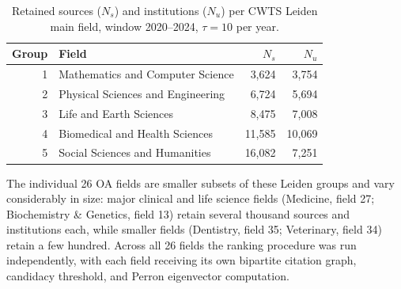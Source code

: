 \begin{table}[ht]
\centering
\caption{Retained sources ($N_s$) and institutions ($N_u$) per CWTS Leiden main field,
         window 2020--2024, $\tau = 10$ per year.}
\label{tab:scale}
\begin{tabular}{rlrr}
\toprule
Group & Field & $N_s$ & $N_u$ \\
\midrule
1 & Mathematics and Computer Science  &  3,624 &  3,754 \\
2 & Physical Sciences and Engineering &  6,724 &  5,694 \\
3 & Life and Earth Sciences           &  8,475 &  7,008 \\
4 & Biomedical and Health Sciences    & 11,585 & 10,069 \\
5 & Social Sciences and Humanities    & 16,082 &  7,251 \\
\bottomrule
\end{tabular}
\end{table}

The individual 26 OA fields are smaller subsets of these Leiden groups and
vary considerably in size: major clinical and life science fields (Medicine,
field 27; Biochemistry \& Genetics, field 13) retain several thousand sources
and institutions each, while smaller fields (Dentistry, field 35; Veterinary,
field 34) retain a few hundred.  Across all 26 fields the ranking procedure
was run independently, with each field receiving its own bipartite citation
graph, candidacy threshold, and Perron eigenvector computation.
